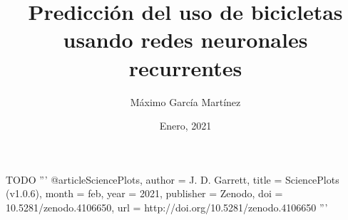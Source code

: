 \documentclass[a4paper, 12pt]{article} %
\author{Máximo García Martínez}
\date{Enero, 2021}
\title{Predicción del uso de bicicletas usando redes neuronales recurrentes}
\begin{document}
\maketitle
\null
\newpage

\tableofcontents
\newpage

\listoffigures
\newpage
\listoftables
\newpage

\printglossary[type=\acronymtype]


\newpage


\newpage
\newpage

\cleardoublepage




\newpage
{} %
\newpage

\newpage

\newpage

\newpage

\newpage

\newpage

\newpage

\newpage

\newpage

\newpage

TODO 
'''
@article{SciencePlots,
  author       = {J. D. Garrett},
  title        = {{SciencePlots (v1.0.6)}},
  month        = feb,
  year         = 2021,
  publisher    = {Zenodo},
  doi          = {10.5281/zenodo.4106650},
  url          = {http://doi.org/10.5281/zenodo.4106650}
}
'''
\printbibliography[heading=bibnumbered] %
\end{document}
